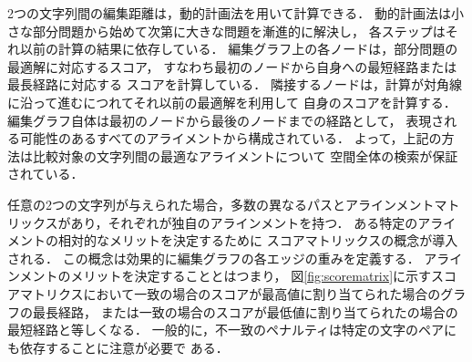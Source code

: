 2つの文字列間の編集距離は，動的計画法を用いて計算できる．
動的計画法は小さな部分問題から始めて次第に大きな問題を漸進的に解決し，
各ステップはそれ以前の計算の結果に依存している．
編集グラフ上の各ノードは，部分問題の最適解に対応するスコア，
すなわち最初のノードから自身への最短経路または最長経路に対応する
スコアを計算している．
隣接するノードは，計算が対角線に沿って進むにつれてそれ以前の最適解を利用して
自身のスコアを計算する．
編集グラフ自体は最初のノードから最後のノードまでの経路として，
表現される可能性のあるすべてのアライメントから構成されている．
よって，上記の方法は比較対象の文字列間の最適なアライメントについて
空間全体の検索が保証されている．

任意の2つの文字列が与えられた場合，多数の異なるパスとアラインメントマトリックスがあり，それぞれが独自のアラインメントを持つ．
ある特定のアライメントの相対的なメリットを決定するために
スコアマトリックスの概念が導入される．
この概念は効果的に編集グラフの各エッジの重みを定義する．
アラインメントのメリットを決定することとはつまり，
図\ref{fig:scorematrix}に示すスコアマトリクスにおいて一致の場合のスコアが最高値に割り当てられた場合のグラフの最長経路，
または一致の場合のスコアが最低値に割り当てられたの場合の最短経路と等しくなる．
一般的に，不一致のペナルティは特定の文字のペアにも依存することに注意が必要で
ある．
